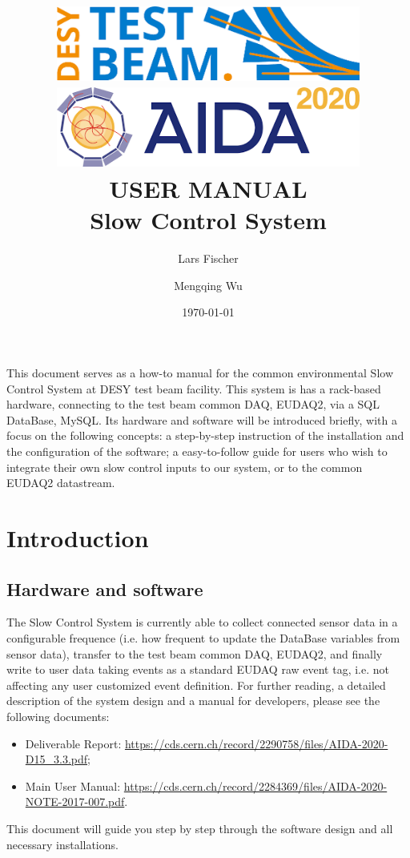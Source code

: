 \documentclass[a4paper,12pt]{scrartcl}
\title{\includegraphics[width=10cm]{figs/DESYTestBeam.png}  \includegraphics[width=10cm]{figs/Aida2020.png} \\ \vspace{2cm} USER MANUAL \\ Slow Control System}
\author[*]{Lars Fischer}
\author[*]{Mengqing Wu}
\affil[*]{Deutsches Elektronen-Synchrotron DESY, Notkestr. 85, 22607 Hamburg, Germany}
\date{\today}
\begin{document}
\clearpage\maketitle
This document serves as a how-to manual for the common environmental Slow Control System at DESY test beam facility. This system is has a rack-based hardware, connecting to the test beam common DAQ, EUDAQ2, via a SQL DataBase, MySQL.
Its hardware and software will be introduced briefly, with a focus on the following concepts:
a step-by-step instruction of the installation and the configuration of the software;
a easy-to-follow guide for users who wish to integrate their own slow control inputs to our system, or to the common EUDAQ2 datastream.
\thispagestyle{empty}
\cleardoublepage

\tableofcontents
\pagebreak

\section{Introduction}
\subsection{Hardware and software}
The Slow Control System is currently able to collect connected sensor data in a configurable frequence (i.e. how frequent to update the DataBase variables from sensor data), transfer to the test beam common DAQ, EUDAQ2, and finally write to user data taking events as a standard EUDAQ raw event tag, i.e. not affecting any user customized event definition.
For further reading, a detailed description of the system design and a manual for developers, please see the following documents:
\begin{itemize}
  \item Deliverable Report: \href{https://cds.cern.ch/record/2290758/files/AIDA-2020-D15\_3.3.pdf}{\footnotesize{https://cds.cern.ch/record/2290758/files/AIDA-2020-D15\_3.3.pdf}};
  \item Main User Manual: \href{https://cds.cern.ch/record/2284369/files/AIDA-2020-NOTE-2017-007.pdf}{\footnotesize{https://cds.cern.ch/record/2284369/files/AIDA-2020-NOTE-2017-007.pdf}}.
\end{itemize}
This document will guide you step by step through the software design and all necessary installations.
\end{document}
